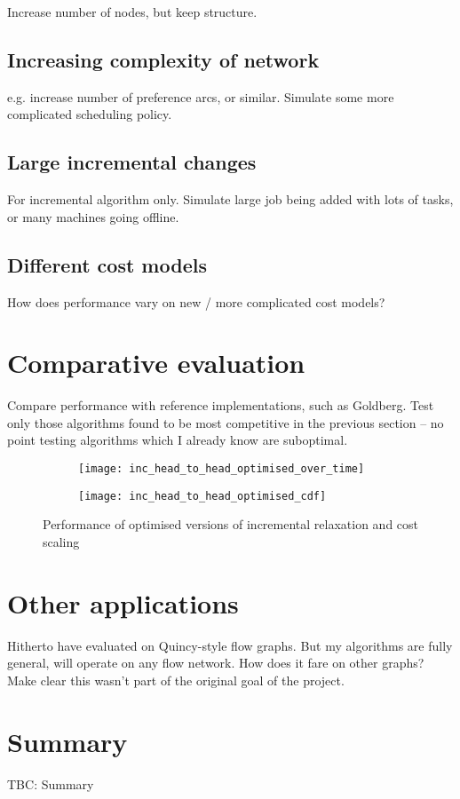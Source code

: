 Increase number of nodes, but keep structure.

\subsection{Increasing complexity of network}

e.g. increase number of preference arcs, or similar. Simulate some more complicated scheduling policy.

\subsection{Large incremental changes}

For incremental algorithm only. Simulate large job being added with lots of tasks, or many machines going offline.

\subsection{Different cost models}

How does performance vary on new / more complicated cost models?

\section{Comparative evaluation} \label{sec:eval-comparative}

Compare performance with reference implementations, such as Goldberg. Test only those algorithms found to be most competitive in the previous section -- no point testing algorithms which I already know are suboptimal.

\begin{figure}
    \centering
    \begin{subfigure}[c]{0.45\textwidth}
        \texttt{[image: inc\_head\_to\_head\_optimised\_over\_time]}
    \end{subfigure}
    \begin{subfigure}[c]{0.45\textwidth}
        \texttt{[image: inc\_head\_to\_head\_optimised\_cdf]}
    \end{subfigure}
    \caption{Performance of optimised versions of incremental relaxation and cost scaling}
    \label{fig:inc-head-to-head-optimised}
\end{figure}

\section{Other applications}

Hitherto have evaluated on Quincy-style flow graphs. But my algorithms are fully general, will operate on any flow network. How does it fare on other graphs? Make clear this wasn't part of the original goal of the project.

\section{Summary}

TBC: Summary